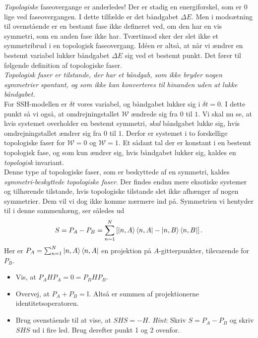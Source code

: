 \documentclass[11pt, a4paper]{article}
\begin{document}
\textit{Topologiske} faseovergange er anderledes! Der er stadig en energiforskel, som er 0 lige ved faseovergangen. I dette tilfælde er det båndgabet $\Delta E$. Men i modsætning til ovenstående er en bestamt fase ikke defineret ved, om den har en vis symmetri, som en anden fase ikke har. Tværtimod sker der slet ikke et symmetribrud i en topologisk faseovergang. Idéen er altså, at når vi ændrer en bestemt variabel lukker båndgabet $\Delta E$ sig ved et bestemt punkt. Det fører til følgende definition af topologiske faser. \\

\textit{Topologisk faser er tilstande, der har et båndgab, som ikke bryder nogen symmetrier spontant, og som ikke kan konverteres til hinanden uden at lukke båndgabet.} \\

For SSH-modellen er $\delta t$ vores variabel, og båndgabet lukker sig i $\delta t = 0$. I dette punkt så vi også, at omdrejningstallet $\mathcal{W}$ ændrede sig fra $0$ til $1$. Vi skal nu se, at hvis systemet overholder en bestemt symmetri, \textit{skal} båndgabet lukke sig, hvis omdrejningstallet ændrer sig fra $0$ til $1$. Derfor er systemet i to forskellige topologiske faser for $\mathcal{W} = 0$ og $\mathcal{W} = 1$. Et sådant tal der er konstant i en bestemt topologisk fase, og som kun ændrer sig, hvis båndgabet lukker sig, kaldes en \textit{topologisk} invariant. \\

Denne type af topologiske faser, som er beskyttede af en symmetri, kaldes \textit{symmetri-beskyttede topologiske faser}. Der findes endnu mere eksotiske systemer og tilhørende tilstande, hvis topologiske tilstande slet ikke afhænger af nogen symmetrier. Dem vil vi dog ikke komme nærmere ind på. Symmetrien vi hentyder til i denne sammenhæng, ser således ud
\begin{equation}
S = P_A - P_B = \sum_{n = 1}^N \left[\ket{n, A}\bra{n, A} - \ket{n, B}\bra{n, B}\right]. 
\label{eq.subgitter_symmetri}
\end{equation}
Her er $P_A = \sum_{n = 1}^N \ket{n, A}\bra{n, A}$ en projektion på $A$-gitterpunkter, tilsvarende for $P_B$. 

\begin{itemize}
	\item Vis, at $P_A H P_A = 0 = P_B H P_B$. 

	\item Overvej, at $P_A + P_B = \mathbb{I}$. Altså er summen af projektionerne identitetsoperatoren.

	\item Brug ovenstående til at vise, at $SHS = - H$. \textit{Hint}: Skriv $S = P_A - P_B$ og skriv $SHS$ ud i fire led. Brug derefter punkt 1 og 2 ovenfor.  
\end{itemize}
\end{document}
